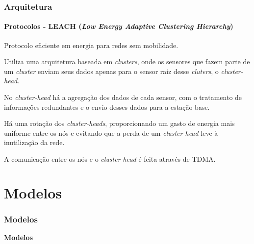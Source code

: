 \documentclass[notes]{beamer}
\begin{document}
\begin{frame}
\label{slide_52}
\frametitle{Arquitetura}
\framesubtitle{Protocolos - LEACH (\textit{Low Energy Adaptive Clustering Hierarchy})}

\begin{block}

Protocolo eficiente em energia para redes sem mobilidade.

\end{block} \pause

\begin{block}

Utiliza uma arquitetura baseada em \textit{clusters}, onde os sensores que fazem parte de um \textit{cluster} enviam seus dados apenas para o sensor raiz desse \textit{cluters}, o \textit{cluster-head}. 

\end{block} \pause

\begin{block}

No \textit{cluster-head} há a agregação dos dados de cada sensor, com o tratamento de informações redundantes e o envio desses dados para a estação base.

\end{block} \pause

\begin{block}

Há uma rotação dos \textit{cluster-heads}, proporcionando um gasto de energia mais uniforme entre os nós e evitando que a perda de um \textit{cluster-head} leve à inutilização da rede.

\end{block} \pause

\begin{block}

A comunicação entre os nós e o \textit{cluster-head} é feita através de TDMA.

\end{block}

\end{frame}

\section{Modelos}

\begin{frame}
\label{slide_53}
\frametitle{Modelos}

\begin{block}

 \center \textbf{Modelos}

\end{block}

\end{frame}
\end{document}
